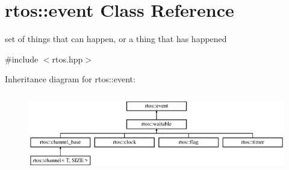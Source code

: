 \hypertarget{classrtos_1_1event}{}\section{rtos\+:\+:event Class Reference}
\label{classrtos_1_1event}


set of things that can happen, or a thing that has happened  




{\ttfamily \#include $<$rtos.\+hpp$>$}

Inheritance diagram for rtos\+:\+:event\+:\begin{figure}[H]
\begin{center}
\leavevmode
\includegraphics[height=3.500000cm]{classrtos_1_1event}
\end{center}
\end{figure}
